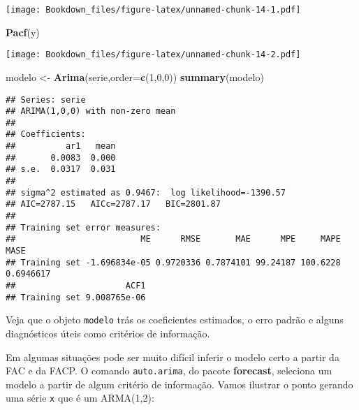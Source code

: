 \documentclass[
]{book}
\newenvironment{Shaded}{\begin{snugshade}}{\end{snugshade}}
\newcommand{\DataTypeTok}[1]{\textcolor[rgb]{0.13,0.29,0.53}{#1}}
\newcommand{\DecValTok}[1]{\textcolor[rgb]{0.00,0.00,0.81}{#1}}
\newcommand{\KeywordTok}[1]{\textcolor[rgb]{0.13,0.29,0.53}{\textbf{#1}}}
\newcommand{\NormalTok}[1]{#1}
\newcommand{\StringTok}[1]{\textcolor[rgb]{0.31,0.60,0.02}{#1}}
\begin{document}
\texttt{[image: Bookdown\_files/figure-latex/unnamed-chunk-14-1.pdf]}

\begin{Shaded}
\begin{Highlighting}[]
\KeywordTok{Pacf}\NormalTok{(y)}
\end{Highlighting}
\end{Shaded}

\texttt{[image: Bookdown\_files/figure-latex/unnamed-chunk-14-2.pdf]}

\begin{Shaded}
\begin{Highlighting}[]
\NormalTok{modelo \textless{}{-}}\StringTok{ }\KeywordTok{Arima}\NormalTok{(serie,}\DataTypeTok{order=}\KeywordTok{c}\NormalTok{(}\DecValTok{1}\NormalTok{,}\DecValTok{0}\NormalTok{,}\DecValTok{0}\NormalTok{))}
\KeywordTok{summary}\NormalTok{(modelo)}
\end{Highlighting}
\end{Shaded}

\begin{verbatim}
## Series: serie 
## ARIMA(1,0,0) with non-zero mean 
## 
## Coefficients:
##          ar1   mean
##       0.0083  0.000
## s.e.  0.0317  0.031
## 
## sigma^2 estimated as 0.9467:  log likelihood=-1390.57
## AIC=2787.15   AICc=2787.17   BIC=2801.87
## 
## Training set error measures:
##                         ME      RMSE       MAE      MPE     MAPE      MASE
## Training set -1.696834e-05 0.9720336 0.7874101 99.24187 100.6228 0.6946617
##                      ACF1
## Training set 9.008765e-06
\end{verbatim}

Veja que o objeto \texttt{modelo} trás os coeficientes estimados, o erro padrão e alguns diagnósticos úteis como critérios de informação.

Em algumas situações pode ser muito difícil inferir o modelo certo a partir da FAC e da FACP. O comando \texttt{auto.arima}, do pacote \textbf{forecast}, seleciona um modelo a partir de algum critério de informação. Vamos ilustrar o ponto gerando uma série \texttt{x} que é um ARMA(1,2):
\end{document}
